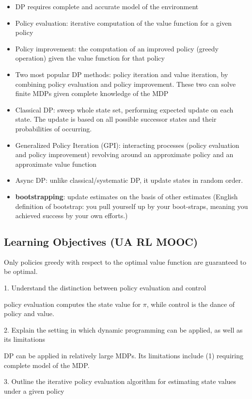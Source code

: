 \documentclass[sutton_barto_notes.tex]{subfiles}
\begin{document}
\begin{itemize}
\item DP requires complete and accurate model of the environment
\item Policy evaluation: iterative computation of the value function for a given policy
\item Policy improvement: the computation of an improved policy (greedy operation) given the value function for that policy
\item Two most popular DP methods: policy iteration and value iteration, by combining policy evaluation and policy improvement. These two can solve finite MDPs given complete knowledge of the MDP
\item Classical DP: sweep whole state set, performing expected update on each state. The update is based on all possible successor states and their probabilities of occurring.
\item Generalized Policy Iteration (GPI): interacting processes (policy evaluation and policy improvement) revolving around an approximate policy and an approximate value function
\item Async DP: unlike classical/systematic DP, it update states in random order.
\item \textbf{bootstrapping}: update estimates on the basis of other estimates (English definition of bootstrap: you pull yourself up by your boot-straps, meaning you achieved success by your own efforts.)
\end{itemize}

\newpage
\subsection{Learning Objectives (UA RL MOOC)}

Only policies greedy with respect to the optimal value function are guaranteed to be optimal.

1. Understand the distinction between policy evaluation and control

policy evaluation computes the state value for $\pi$, while control is the dance of policy and value.

2. Explain the setting in which dynamic programming can be applied, as well as its limitations

DP can be applied in relatively large MDPs. Its limitations include (1) requiring complete model of the MDP.

3. Outline the iterative policy evaluation algorithm for estimating state values under a given policy
\end{document}
